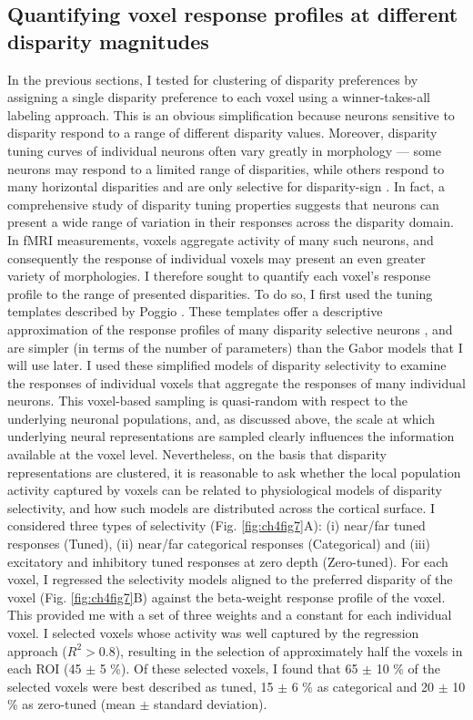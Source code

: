 \subsection{Quantifying voxel response profiles at different disparity magnitudes}
In the previous sections, I tested for clustering of disparity preferences by assigning a single disparity preference to each voxel using a winner-takes-all labeling approach. This is an obvious simplification because neurons sensitive to disparity respond to a range of different disparity values. Moreover, disparity tuning curves of individual neurons often vary greatly in morphology --- some neurons may respond to a limited range of disparities, while others respond to many horizontal disparities and are only selective for disparity-sign \cite{Poggio:1988ij,Poggio:1977ys}. In fact, a comprehensive study of disparity tuning properties suggests that neurons can present a wide range of variation in their responses across the disparity domain. In fMRI measurements, voxels aggregate activity of many such neurons, and consequently the response of individual voxels may present an even greater variety of morphologies. I therefore sought to quantify each voxel's response profile to the range of presented disparities. To do so, I first used the tuning templates described by Poggio \cite{Poggio:1988ij,Poggio:1977ys}. These templates offer a descriptive approximation of the response profiles of many disparity selective neurons \cite{DeAngelis:1999fk,Prince:2002uq}, and are simpler (in terms of the number of parameters) than the Gabor models that I will use later. I used these simplified models of disparity selectivity to examine the responses of individual voxels that aggregate the responses of many individual neurons. This voxel-based sampling is quasi-random with respect to the underlying neuronal populations, and, as discussed above, the scale at which underlying neural representations are sampled clearly influences the information available at the voxel level. Nevertheless, on the basis that disparity representations are clustered, it is reasonable to ask whether the local population activity captured by voxels can be related to physiological models of disparity selectivity, and how such models are distributed across the cortical surface. 
I considered three types of selectivity (Fig. \ref{fig:ch4fig7}A): (i) near/far tuned responses (Tuned), (ii) near/far categorical responses (Categorical) and (iii) excitatory and inhibitory tuned responses at zero depth (Zero-tuned). For each voxel, I regressed the selectivity models aligned to the preferred disparity of the voxel (Fig. \ref{fig:ch4fig7}B) against the beta-weight response profile of the voxel. This provided me with a set of three weights and a constant for each individual voxel. I selected voxels whose activity was well captured by the regression approach ($R^2 > 0.8$), resulting in the selection of approximately half the voxels in each ROI (45 $\pm$ 5 \%). Of these selected voxels, I found that 65 $\pm$ 10 \% of the selected voxels were best described as tuned, 15 $\pm$ 6 \% as categorical and 20 $\pm$ 10 \% as zero-tuned (mean $\pm$ standard deviation).

